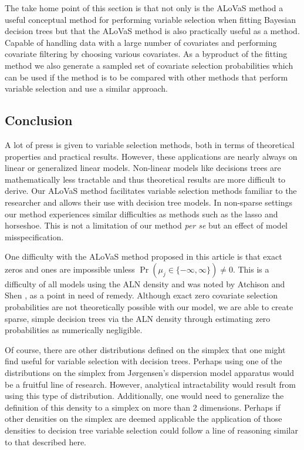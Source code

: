		The take home point of this section is that not only is the ALoVaS method a useful conceptual method for performing variable selection when fitting Bayesian decision trees but that the ALoVaS method is also practically useful as a method. Capable of handling data with a large number of covariates and performing covariate filtering by choosing various covariates. As a byproduct of the fitting method we also generate a sampled set of covariate selection probabilities which can be used if the method is to be compared with other methods that perform variable selection and use a similar approach. 

\subsection{Conclusion}\label{sec:Conclusion}

A lot of press is given to variable selection methods, both in terms of theoretical properties and practical results. However, these applications are nearly always on linear or generalized linear models. Non-linear models like decisions trees are mathematically less tractable and thus theoretical results are more difficult to derive. Our ALoVaS method facilitates variable selection methods familiar to the researcher and allows their use with decision tree models. In non-sparse settings our method experiences similar difficulties as methods such as the lasso and horseshoe. This is not a limitation of our method \emph{per se} but an effect of model misspecification. 

One difficulty with the ALoVaS method proposed in this article is that exact zeros and ones are impossible unless $\Pr(\mu_j \in \{-\infty,\infty\})\neq 0$. This is a difficulty of all models using the ALN density and was noted by Atchison and Shen \cite{atchison1980logistic}, as a point in need of remedy. Although exact zero covariate selection probabilities are not theoretically possible with our model, we are able to create sparse, simple decision trees via the ALN density through estimating zero probabilities as numerically negligible. 

Of course, there are other distributions defined on the simplex that one might find useful for variable selection with decision trees. Perhaps using one of the distributions on the simplex from J\o rgensen's \cite{jorgensen1997theory} dispersion model apparatus would be a fruitful line of research. However, analytical intractability would result from using this type of distribution. Additionally, one would need to generalize the definition of this density to a simplex on more than 2 dimensions. Perhaps if other densities on the simplex are deemed applicable the application of those densities to decision tree variable selection could follow a line of reasoning similar to that described here. 

